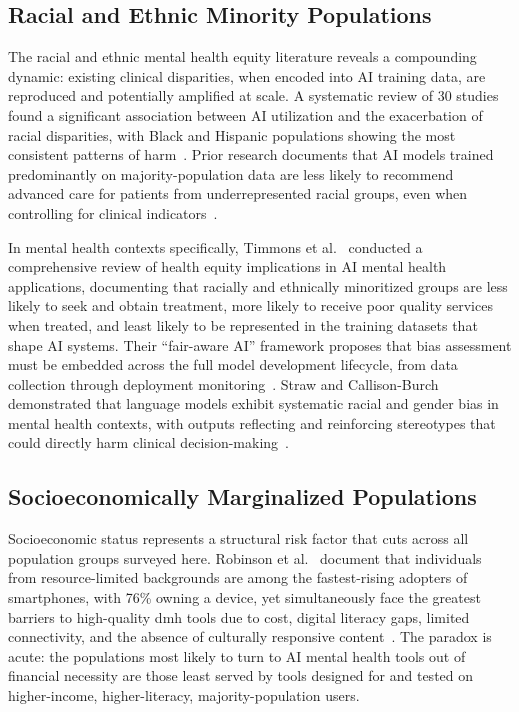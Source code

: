 \subsection{Racial and Ethnic Minority Populations}

The racial and ethnic mental health equity literature reveals a compounding dynamic: existing clinical disparities, when encoded into AI training data, are reproduced and potentially amplified at scale. A systematic review of 30 studies found a significant association between AI utilization and the exacerbation of racial disparities, with Black and Hispanic populations showing the most consistent patterns of harm~\cite{haider_2024}. Prior research documents that AI models trained predominantly on majority-population data are less likely to recommend advanced care for patients from underrepresented racial groups, even when controlling for clinical indicators~\cite{timmons_2023}.

In mental health contexts specifically, Timmons et al.~\cite{timmons_2023} conducted a comprehensive review of health equity implications in AI mental health applications, documenting that racially and ethnically minoritized groups are less likely to seek and obtain treatment, more likely to receive poor quality services when treated, and least likely to be represented in the training datasets that shape AI systems. Their ``fair-aware AI'' framework proposes that bias assessment must be embedded across the full model development lifecycle, from data collection through deployment monitoring~\cite{timmons_2023}. Straw and Callison-Burch~\cite{straw_2020} demonstrated that language models exhibit systematic racial and gender bias in mental health contexts, with outputs reflecting and reinforcing stereotypes that could directly harm clinical decision-making~\cite{straw_2020}.

\subsection{Socioeconomically Marginalized Populations}

Socioeconomic status represents a structural risk factor that cuts across all population groups surveyed here. Robinson et al.~\cite{robinson_2024} document that individuals from resource-limited backgrounds are among the fastest-rising adopters of smartphones, with 76\% owning a device, yet simultaneously face the greatest barriers to high-quality \gls{dmh} tools due to cost, digital literacy gaps, limited connectivity, and the absence of culturally responsive content~\cite{robinson_2024}. The paradox is acute: the populations most likely to turn to AI mental health tools out of financial necessity are those least served by tools designed for and tested on higher-income, higher-literacy, majority-population users.

